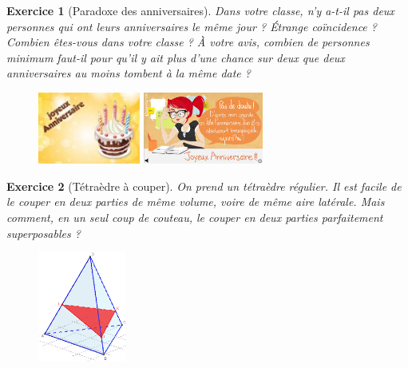 \documentclass[12pt]{article}
\theoremstyle{break}
\newtheorem{exo}{Exercice}
\begin{document}
\begin{exo}[Paradoxe des anniversaires]
Dans votre classe, n'y a-t-il pas deux personnes qui ont leurs anniversaires le même jour ? Étrange coïncidence ? Combien êtes-vous dans votre classe ? À votre avis, combien de personnes minimum faut-il pour qu'il y ait plus d'une chance sur deux que deux anniversaires au moins tombent à la même date ?

\begin{figure}[h!]
	\centering
	\includegraphics[width=0.3\textwidth]{AnniversaireGateau.jpg}
    \includegraphics[width=0.35\textwidth]{ReflexionAnniversaire.jpg}
\end{figure}
\end{exo}


\begin{exo}[Tétraèdre à couper]
On prend un tétraèdre régulier. Il est facile de le couper en deux parties de même volume, voire de même aire latérale. Mais comment, en un seul coup de couteau, le couper en deux parties parfaitement superposables ?

\begin{figure}[h!]
	\centering
    \includegraphics[width=0.26\textwidth]{CoupeTetraedre.png}
\end{figure}
\end{exo}
\end{document}
